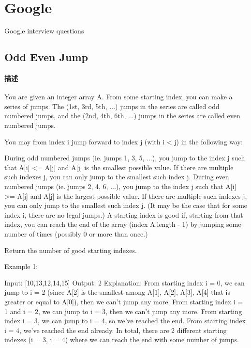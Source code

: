 \chapter{Google}
Google interview questions
\newline

\section{Odd Even Jump} %
\label{sec:odd-even-jump}


\subsubsection{描述}
You are given an integer array A.  From some starting index, you can make a series of jumps.  The (1st, 3rd, 5th, ...) jumps in the series are called odd numbered jumps, and the (2nd, 4th, 6th, ...) jumps in the series are called even numbered jumps.

You may from index i jump forward to index j (with i < j) in the following way:

During odd numbered jumps (ie. jumps 1, 3, 5, ...), you jump to the index j such that A[i] <= A[j] and A[j] is the smallest possible value.  If there are multiple such indexes j, you can only jump to the smallest such index j.
During even numbered jumps (ie. jumps 2, 4, 6, ...), you jump to the index j such that A[i] >= A[j] and A[j] is the largest possible value.  If there are multiple such indexes j, you can only jump to the smallest such index j.
(It may be the case that for some index i, there are no legal jumps.)
A starting index is good if, starting from that index, you can reach the end of the array (index A.length - 1) by jumping some number of times (possibly 0 or more than once.)

Return the number of good starting indexes.

Example 1:
\begin{Code}
Input: [10,13,12,14,15]
Output: 2
Explanation: 
From starting index i = 0, we can jump to i = 2 (since A[2] is the smallest among A[1], A[2], A[3], A[4] that is greater or equal to A[0]), then we can't jump any more.
From starting index i = 1 and i = 2, we can jump to i = 3, then we can't jump any more.
From starting index i = 3, we can jump to i = 4, so we've reached the end.
From starting index i = 4, we've reached the end already.
In total, there are 2 different starting indexes (i = 3, i = 4) where we can reach the end with some number of jumps.
\end{Code}

